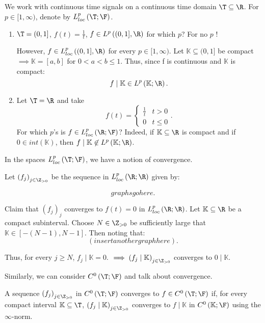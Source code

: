 We work with continuous time signals on a continuous time domain $\T \subseteq \R$. For $p \in [1, \infty)$, denote by $L^{p}_{loc} \left( \T ; \F \right) $.

\begin{example}
	\begin{enumerate}
		\item $\T = (0, 1]$, $f\left( t \right)  = \frac{1}{t}$, $f \in  L^{p}\left( (0, 1], \R \right) $ for which $p$? For no $p$ ! 

		However, $f \in  L^{p}_{loc} \left( (0, 1], \R \right) $ for every $p \in  [1, \infty)$. Let $\mathbb{K} \subseteq (0, 1]$ be compact $\implies \mathbb{K} = \left[ a, b \right] $ for $0<a<b\le 1$. Thus, since f is continuous and $\mathbb{K}$ is compact:
			\[
				f  \mid \mathbb{K} \in  L^{p} \left( \mathbb{K}; \R \right) 
			.\] 

		\item Let $\T = \R $ and take 
			\[f\left( t \right)  =
				\begin{cases}
					\frac{1}{t} & t > 0 \\
					0 & t \le  0
			\end{cases}	 
			.\] 
			For which $p$'s is $f \in  L^{p}_{loc}\left( \R; \F \right) $? Indeed, if $\mathbb{K} \subseteq \R$ is compact and if $0 \in  int\left( \mathbb{K} \right) $, then $f  \mid  \mathbb{K} \not\in L^{p}\left( \mathbb{K}; \R \right) $.
	\end{enumerate}
\end{example}


In the spaces $L ^{p}_{loc}\left( \T; \F \right) $, we have a notion of convergence. 

\begin{definition}
	Let $\left( f_{j} \right) _{j \in  \Z_{>0}}$ be the sequence in $L^{p}_{loc}\left( \R; \R \right)$	given by: 

		\[
		graphs go here 
		.\] 

		Claim that $\left( f_{j} \right) _{j}$ converges to $f\left( t \right)  = 0$ in $L^{p}_{loc}\left( \R; \R \right) $. Let $\mathbb{K}\subseteq \R$ be a compact subinterval. Choose $N \in  \Z _{>0}$ be sufficiently large that $\mathbb{K} \in  \left[ -\left( N - 1 \right) , N - 1 \right] $. Then noting that:
		\[
			\left( insert another graph here  \right) 
		.\] 
		
		Thus, for every $j \ge  N$, $f_{j}  \mid \mathbb{K} = 0$. 
		$\implies \left( f_{j} \mid \mathbb{K} \right) _{j \in  \Z_{>0}}$ converges to $0 \mid \mathbb{K}$. 
\end{definition}

Similarly, we can consider $C^{0} \left( \T; \F \right) $ and talk about convergence. 

\begin{definition}
	A sequence $\left( f_{j} \right) _{j \in  \Z_{>0}}$ in $C ^{0}\left( \T; \F \right) $ converges to $f \in  C^{0}\left( \T; \F \right) $ if, for every compact interval $\mathbb{K} \subseteq \T$, $\left( f_{j} \mid \mathbb{K} \right) _{j \in  \Z_{>0}}$ converges to $f \mid \mathbb{K}$ in $C^{0} \left( \mathbb{K}; \F \right) $ using the $\infty$-norm.
\end{definition}
